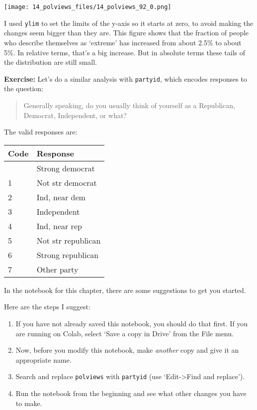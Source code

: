 \begin{center}
\texttt{[image: 14\_polviews\_files/14\_polviews\_92\_0.png]}
\end{center}

I used \passthrough{\lstinline!ylim!} to set the limits of the y-axis so
it starts at zero, to avoid making the changes seem bigger than they
are. This figure shows that the fraction of people who describe
themselves as `extreme' has increased from about 2.5\% to about 5\%. In
relative terms, that's a big increase. But in absolute terms these tails
of the distribution are still small.

\textbf{Exercise:} Let's do a similar analysis with
\passthrough{\lstinline!partyid!}, which encodes responses to the
question:

\begin{quote}
Generally speaking, do you usually think of yourself as a Republican,
Democrat, Independent, or what?
\end{quote}

\pagebreak

The valid responses are:

\begin{longtable}[]{ll}
\toprule
Code & Response \\
\midrule
\endhead
\bottomrule
\endlastfoot
0 & Strong democrat \\
1 & Not str democrat \\
2 & Ind, near dem \\
3 & Independent \\
4 & Ind, near rep \\
5 & Not str republican \\
6 & Strong republican \\
7 & Other party \\
\end{longtable}

In the notebook for this chapter, there are some suggestions to get you
started.

Here are the steps I suggest:

\begin{enumerate}
\def\labelenumi{\arabic{enumi})}
\item
  If you have not already saved this notebook, you should do that first.
  If you are running on Colab, select `Save a copy in Drive' from the
  File menu.
\item
  Now, before you modify this notebook, make \emph{another} copy and
  give it an appropriate name.
\item
  Search and replace \passthrough{\lstinline!polviews!} with
  \passthrough{\lstinline!partyid!} (use `Edit-\textgreater Find and
  replace').
\item
  Run the notebook from the beginning and see what other changes you
  have to make.
\end{enumerate}

